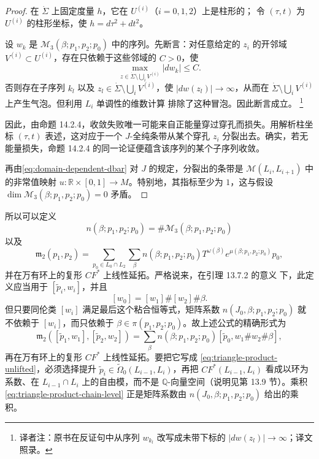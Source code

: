 \begin{proof}
在 $\dot\Sigma$ 上固定\personKahler{}度量 $h$，它在 $U^{(i)}$（$i=0,1,2$）上是柱形的；
令 $(\tau,t)$ 为 $U^{(i)}$ 的柱形坐标，使 $h=d\tau^2+dt^2$。

设 $w_k$ 是 $\mathcal M_3(\beta;p_1,p_2;p_0)$ 中的序列。先断言：对任意给定的
$z_i$ 的开邻域 $V^{(i)}\subset U^{(i)}$，存在只依赖于这些邻域的 $C>0$，使
\[
 \max_{z\in\dot\Sigma\setminus\bigcup_iV^{(i)}}|dw_k|\leq C.
\]
否则存在子序列 $k_l$ 以及
$z_l\in\dot\Sigma\setminus\bigcup_iV^{(i)}$，使 $|dw(z_l)|\to\infty$，从而在
$\dot\Sigma\setminus\bigcup_iV^{(i)}$ 上产生气泡。但利用 $L_i$ 单调性的维数计算
排除了这种冒泡。因此断言成立。
\footnote{译者注：原书在反证句中从序列 $w_{k_l}$ 改写成未带下标的
$|dw(z_l)|\to\infty$；译文照录。}

因此，由命题 14.2.4，收敛失败唯一可能来自正能量穿过穿孔而损失。用解析柱坐标
$(\tau,t)$ 表述，这对应于一个 $J$-全纯条带从某个穿孔 $z_i$ 分裂出去。确实，若无
能量损失，命题 14.2.4 的同一论证便蕴含该序列的某个子序列收敛。

再由\eqref{eq:domain-dependent-dbar} 对 $J$ 的规定，分裂出的条带是
$\mathcal M(L_i,L_{i+1})$ 中的非常值映射
$u:\mathbb R\times[0,1]\to M$。特别地，其指标至少为 $1$，这与假设
$\dim\mathcal M_3(\beta;p_1,p_2;p_0)=0$ 矛盾。
\end{proof}

所以可以定义
\[
 n(\beta;p_1,p_2;p_0)=\#\mathcal M_3(\beta;p_1,p_2;p_0)
\]
以及
\begin{equation}
 \mathfrak m_2(p_1,p_2)
 =\sum_{p_0\in L_0\cap L_2}\sum_\beta
 n(\beta;p_1,p_2;p_0)T^{\omega(\beta)}e^{\mu(\beta;p_1,p_2;p_0)}p_0,
\label{eq:triangle-product-unlifted}
\end{equation}
并在万有\personNovikov{}环上的复形 $CF^*$ 上线性延拓。严格说来，在引理 13.7.2 的意义
下，此定义应当用于 $[\widetilde p_i,w_i]$，并且
\[
 [w_0]=[w_1]\#[w_2]\#\beta.
\]
但只要同伦类 $[w_i]$ 满足最后这个粘合恒等式，矩阵系数
$n(J_0,\beta;p_1,p_2;p_0)$ 就不依赖于 $[w_i]$，而只依赖于
$\beta\in\pi(p_1,p_2;p_0)$。故上述公式的精确形式为
\begin{equation}
 \mathfrak m_2([\widetilde p_1,w_1],[\widetilde p_2,w_2])
 =\sum_\beta n(\beta;p_1,p_2;p_0)
 [\widetilde p_0,w_1\#w_2\#\beta],
\label{eq:triangle-product-lifted}
\end{equation}
再在万有\personNovikov{}环上的复形 $CF^*$ 上线性延拓。要把它写成
\eqref{eq:triangle-product-unlifted}，必须选择提升
$\widetilde p_i\in\widetilde\Omega_0(L_{i-1},L_i)$，再把 $CF^*(L_{i-1},L_i)$
看成以\personNovikov{}环为系数、在 $L_{i-1}\cap L_i$ 上的自由模，而不是
$\mathbb Q$-向量空间（说明见第 13.9 节）。乘积
\eqref{eq:triangle-product-chain-level} 正是矩阵系数由
$n(J_0,\beta;p_1,p_2;p_0)$ 给出的乘积。

